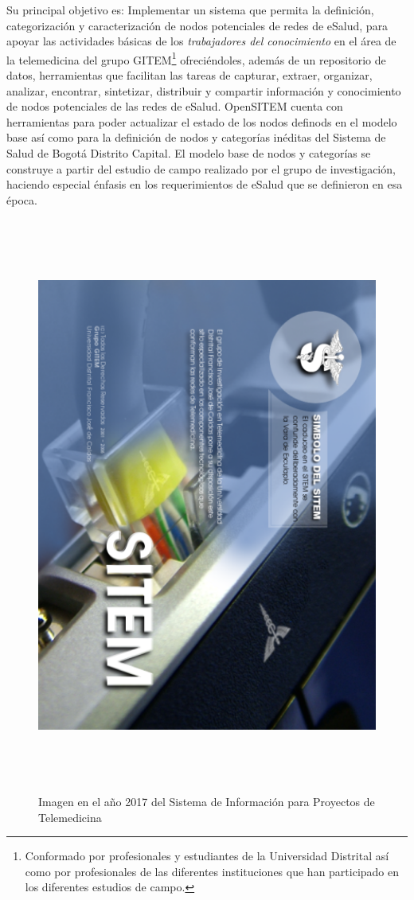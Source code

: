 Su principal objetivo es: Implementar un sistema que permita la definición, categorización y caracterización de nodos potenciales de redes de eSalud, para apoyar las actividades básicas de los \textit{trabajadores del conocimiento} en el área de la telemedicina del grupo GITEM\footnote{Conformado por profesionales y estudiantes de la Universidad Distrital así como por profesionales de las diferentes instituciones que han participado en los diferentes estudios de campo.}  ofreciéndoles, además de un repositorio de datos, herramientas que facilitan las tareas de capturar, extraer, organizar, analizar, encontrar, sintetizar, distribuir y compartir información y conocimiento de nodos potenciales de las redes de eSalud. OpenSITEM cuenta con herramientas para poder  actualizar el estado de los nodos definods en el modelo base así como para la definición de nodos y categorías inéditas del Sistema de Salud de Bogotá Distrito Capital. El modelo base de nodos y categorías se construye a partir del estudio de campo realizado por el grupo de investigación, haciendo especial énfasis en los requerimientos de eSalud que se definieron en esa época. 
\begin{figure}
 \centering
 \includegraphics[width=142mm, height=190mm]{sitem_principal.png}
 \caption{Imagen en el año 2017 del Sistema de Información para Proyectos de Telemedicina}
 \label{pantalla_sitem}
\end{figure}


